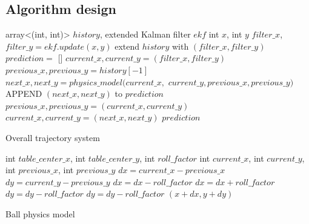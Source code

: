 \documentclass{article}
\begin{document}
\subsection{Algorithm design}
\begin{algorithm}[H]
\begin{algorithmic}
    array<(int, int)> $history$, extended Kalman filter $ekf$
    int $x$, int $y$
   \STATE $filter\_x$, $filter\_y=ekf.update(x,y)$
   \STATE extend $history$ with $(filter\_x,filter\_y)$
   \STATE $prediction =$ []
   \STATE $current\_x,current\_y =  (filter\_x,filter\_y)$
   \STATE $previous\_x, previous\_y = history[-1]$
      \STATE $next\_x, next\_y = physics\_model(current\_x,$
      \STATE $current\_y, previous\_x, previous\_y)$
      \STATE APPEND $(next\_x,next\_y)$ to $prediction$
      \STATE $previous\_x, previous\_y = (current\_x,current\_y)$
      \STATE $current\_x,current\_y=(next\_x,next\_y)$
   \ENDFOR
   \RETURN $prediction$
\end{algorithmic}
  \caption{Overall trajectory system}
  \label{alg:trajectory_prediction}
\end{algorithm}

\begin{algorithm}[H]
\begin{algorithmic}
    int $table\_center\_x$, int $table\_center\_y$, int $roll\_factor$
    int $current\_x$, int $current\_y$, int $previous\_x$, int $previous\_y$
   \STATE $dx = current\_x-previous\_x$
   \STATE $dy = current\_y-previous\_y$
      \STATE $dx = dx - roll\_factor$
   \ELSE
      \STATE $dx = dx + roll\_factor$
   \ENDIF
      \STATE $dy = dy - roll\_factor$
   \ELSE
      \STATE $dy = dy - roll\_factor$
   \ENDIF
   \RETURN $(x + dx, y + dy)$
\end{algorithmic}
  \caption{Ball physics model}
  \label{alg:physics_model}
\end{algorithm}

\appendix
\end{document}
